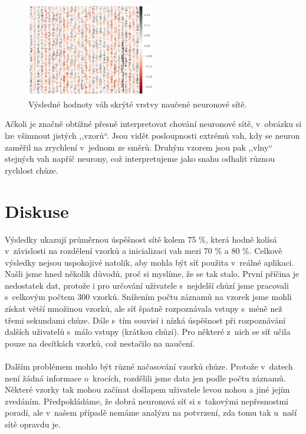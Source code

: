 \documentclass[a4paper, 10pt, twocolumn]{article}
\begin{document}
\begin{figure}[ht]
\centering
\includegraphics[width=0.5\textwidth]{img/weights.pdf}
\caption{Výsledné hodnoty váh skrýté vrstvy naučené neuronové sítě.}
\label{weighs}
\end{figure}


Ačkoli je značně obtížné přesně interpretovat chování neuronové sítě, v~obrázku si lze všimnout jistých ,,vzorů``. Jsou vidět posloupnosti extrémů vah, kdy se neuron zaměřil na zrychlení v~jednom ze směrů. Druhým vzorem jsou pak ,,vlny`` stejných vah napříč neurony, což interpretujeme jako snahu odhalit různou rychlost chůze.
\section{Diskuse}
    Výsledky ukazují průměrnou úspěšnost sítě kolem 75 \%, která hodně kolísá v~závislosti na rozdělení vzorků a inicializaci vah mezi 70 \% a 80 \%. Celkově výsledky nejsou uspokojivé natolik, aby mohla být síť použita v~reálné aplikaci. Našli jsme hned několik důvodů, proč si myslíme, že se tak stalo. První příčina je nedostatek dat, protože i pro určování uživatele s~nejdelší chůzí jsme pracovali s~celkovým počtem 300 vzorků. Snížením počtu záznamů na vzorek jsme mohli získat větší množinou vzorků, ale síť špatně rozpoznávala vstupy s~méně než třemi sekundami chůze. Dále s~tím souvisí i nízká úspěšnost při rozpoznávání dalších uživatelů s~málo vstupy (krátkou chůzí). Pro některé z~nich se síť učila pouze na desítkách vzorků, což nestačilo na naučení.
    \paragraph{}
    Dalším problémem mohlo být různé načasování vzorků chůze. Protože v~datech není žádná informace o~krocích, rozdělili jsme data jen podle počtu záznamů. Některé vzorky tak mohou začínat došlapem uživatele levou nohou a jiné jejím zvedáním. Předpokládáme, že dobrá neuronová síť si s~takovými nepřesnostmi poradí, ale v~našem případě nemáme analýzu na potvrzení, zda tomu tak u~naší sítě opravdu je.
\end{document}
